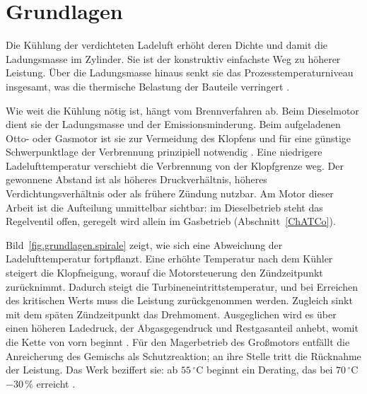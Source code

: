 
\chapter{Grundlagen}
\label{ch.grundlagen}

Die Kühlung der verdichteten Ladeluft erhöht deren Dichte und damit die
Ladungsmasse im Zylinder. Sie ist der konstruktiv einfachste Weg zu
höherer Leistung. Über die Ladungsmasse hinaus senkt sie das
Prozesstemperaturniveau insgesamt, was die thermische Belastung der
Bauteile verringert
\cite[S.~358]{merkerGrundlagenVerbrennungsmotorenSimulation2009}.

Wie weit die Kühlung nötig ist, hängt vom Brennverfahren ab. Beim
Dieselmotor dient sie der Ladungsmasse und der Emissionsminderung. Beim
aufgeladenen Otto- oder Gasmotor ist sie zur Vermeidung des Klopfens und
für eine günstige Schwerpunktlage der Verbrennung prinzipiell notwendig
\cite[S.~358\,f.]{merkerGrundlagenVerbrennungsmotorenSimulation2009}.
Eine niedrigere Ladelufttemperatur verschiebt die Verbrennung von der
Klopfgrenze weg. Der gewonnene Abstand ist als höheres Druckverhältnis,
höheres Verdichtungsverhältnis oder als frühere Zündung nutzbar. Am
Motor dieser Arbeit ist die Aufteilung unmittelbar sichtbar: im
Dieselbetrieb steht das Regelventil offen, geregelt wird allein im
Gasbetrieb (Abschnitt~\ref{ChATCo}).

Bild~\ref{fig.grundlagen.spirale} zeigt, wie sich eine Abweichung der
Ladelufttemperatur fortpflanzt. Eine erhöhte Temperatur nach dem Kühler
steigert die Klopfneigung, worauf die Motorsteuerung den Zündzeitpunkt
zurücknimmt. Dadurch steigt die Turbineneintrittstemperatur, und bei
Erreichen des kritischen Werts muss die Leistung zurückgenommen werden.
Zugleich sinkt mit dem späten Zündzeitpunkt das Drehmoment. Ausgeglichen
wird es über einen höheren Ladedruck, der Abgasgegendruck und
Restgasanteil anhebt, womit die Kette von vorn beginnt
\cite[S.~359\,f.]{merkerGrundlagenVerbrennungsmotorenSimulation2009}.
Für den Magerbetrieb des Großmotors entfällt die Anreicherung des
Gemischs als Schutzreaktion; an ihre Stelle tritt die Rücknahme der
Leistung. Das Werk beziffert sie: ab $55\,^\circ$C beginnt
ein Derating, das bei $70\,^\circ$C $-30\,\%$ erreicht
\cite[S.~58]{everllencese4960DFProject2026}.

